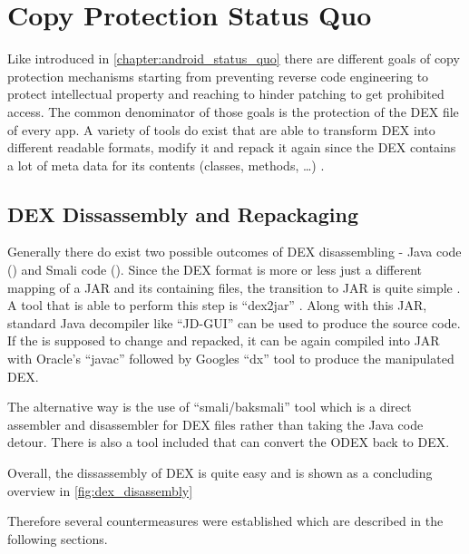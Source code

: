 \chapter{Copy Protection Status Quo}
\label{chapter:copy_protection_status_quo}

Like introduced in \autoref{chapter:android_status_quo} there
are different goals of copy protection mechanisms starting from
preventing reverse code engineering to protect intellectual property
and reaching to hinder patching to get prohibited access.
The common denominator of those goals is the protection of
the DEX file of every app. A variety of tools do exist that
are able to transform DEX into different readable formats,
modify it and repack it again since the DEX contains
a lot of meta data for its contents (classes, methods, \ldots)
\parencite{dex}.


\section{DEX Dissassembly and Repackaging}
Generally there do exist two possible outcomes of DEX disassembling
- Java code () and Smali code ().
Since the DEX format is more or less just a different mapping of a
JAR and its containing  files, the transition to JAR
is quite simple \parencite{dvminternals}. A tool that is able to
perform this step is ``dex2jar'' \parencite{dex2jartool}.
Along with this JAR, standard Java decompiler like ``JD-GUI''
\parencite{jdtool} can be used to produce the  source code.
If the  is supposed to change and repacked, it can
be again compiled into JAR with Oracle's ``javac'' \parencite{javactool}
followed by Googles ``dx'' tool \parencite{dxtool}
to produce the manipulated DEX.

The alternative way is the use of ``smali/baksmali'' tool
\parencite{smalitool} which is a direct assembler and disassembler
for DEX files rather than taking the Java code detour. There is also
a tool included that can convert the ODEX back to DEX.

Overall, the dissassembly of DEX is quite easy and is shown as a
concluding overview in \autoref{fig:dex_disassembly}

Therefore several countermeasures were established which are
described in the following sections.

